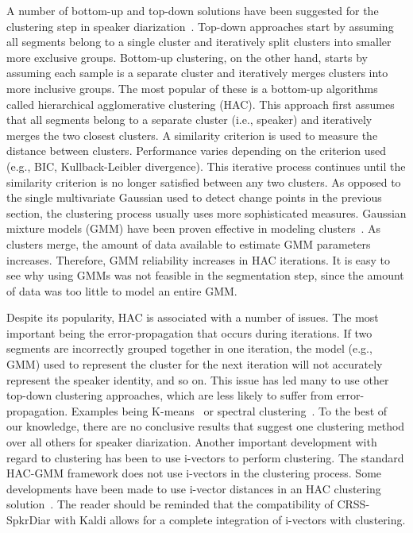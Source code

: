 A number of bottom-up and top-down solutions have been suggested for the clustering step in speaker diarization~\cite{tranterreynolds2006drzoverview,anguera2012DRZreview}. 
Top-down approaches start by assuming all segments belong to a single cluster and iteratively split clusters into smaller more exclusive groups. 
Bottom-up clustering, on the other hand, starts by assuming each sample is a separate cluster and iteratively merges clusters into more inclusive groups. 
The most popular of these is a bottom-up algorithms called hierarchical agglomerative clustering (HAC). 
This approach first assumes that all segments belong to a separate cluster (i.e., speaker) and iteratively merges the two closest clusters. 
A similarity criterion is used to measure the distance between clusters. 
Performance varies depending on the criterion used (e.g., BIC, Kullback-Leibler divergence). 
This iterative process continues until the similarity criterion is no longer satisfied between any two clusters. 
As opposed to the single multivariate Gaussian used to detect change points in the previous section, the clustering process usually uses more sophisticated measures. 
Gaussian mixture models (GMM) have been proven effective in modeling clusters~\cite{zelenak2010albayzin}. 
As clusters merge, the amount of data available to estimate GMM parameters increases. 
Therefore, GMM reliability increases in HAC iterations. 
It is easy to see why using GMMs was not feasible in the segmentation step, since the amount of data was too little to model an entire GMM. 

Despite its popularity, HAC is associated with a number of issues. 
The most important being the error-propagation that occurs during iterations. 
If two segments are incorrectly grouped together in one iteration, the model (e.g., GMM) used to represent the cluster for the next iteration will not accurately represent the speaker identity, and so on. 
This issue has led many to use other top-down clustering approaches, which are less likely to suffer from error-propagation. Examples being K-means~\cite{shum2011exploiting} or spectral clustering~\cite{shum2012spectralclustering, ning2006spectral}. 
To the best of our knowledge, there are no conclusive results that suggest one clustering method over all others for speaker diarization. 
Another important development with regard to clustering has been to use i-vectors to perform clustering. 
The standard HAC-GMM framework does not use i-vectors in the clustering process. 
Some developments have been made to use i-vector distances in an HAC clustering solution~\cite{}. 
The reader should be reminded that the compatibility of CRSS-SpkrDiar with Kaldi allows for a complete integration of i-vectors with clustering. 

